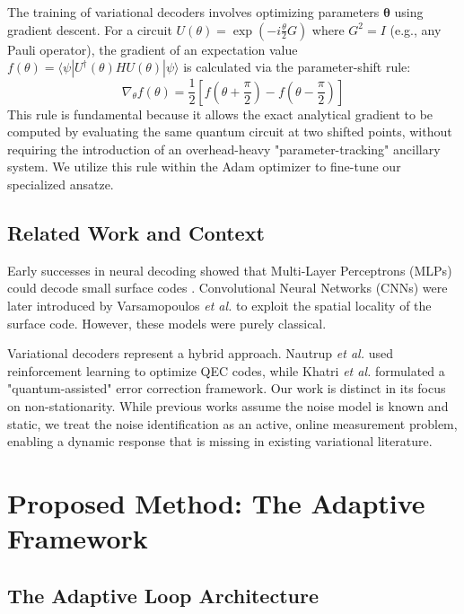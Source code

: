 \documentclass[journal,twocolumn]{IEEEtran}
\begin{document}
The training of variational decoders involves optimizing parameters $\boldsymbol{\theta}$ using gradient descent. For a circuit $U(\theta) = \exp(-i \frac{\theta}{2} G)$ where $G^2 = I$ (e.g., any Pauli operator), the gradient of an expectation value $f(\theta) = \langle \psi | U^\dagger(\theta) H U(\theta) | \psi \rangle$ is calculated via the parameter-shift rule:
\begin{equation}
    \nabla_\theta f(\theta) = \frac{1}{2} \left[ f\left(\theta + \frac{\pi}{2}\right) - f\left(\theta - \frac{\pi}{2}\right) \right]
\end{equation}
This rule is fundamental because it allows the exact analytical gradient to be computed by evaluating the same quantum circuit at two shifted points, without requiring the introduction of an overhead-heavy "parameter-tracking" ancillary system. We utilize this rule within the Adam optimizer to fine-tune our specialized ansatze.

\subsection{Related Work and Context}

Early successes in neural decoding showed that Multi-Layer Perceptrons (MLPs) could decode small surface codes \cite{chamberland2018deep}. Convolutional Neural Networks (CNNs) were later introduced by Varsamopoulos \textit{et al.} \cite{varsamopoulos2017decoding} to exploit the spatial locality of the surface code. However, these models were purely classical. 

Variational decoders represent a hybrid approach. Nautrup \textit{et al.} \cite{nautrup2019optimizing} used reinforcement learning to optimize QEC codes, while Khatri \textit{et al.} \cite{khatri2019quantum} formulated a "quantum-assisted" error correction framework. Our work is distinct in its focus on non-stationarity. While previous works assume the noise model is known and static, we treat the noise identification as an active, online measurement problem, enabling a dynamic response that is missing in existing variational literature.

\section{Proposed Method: The Adaptive Framework}

\subsection{The Adaptive Loop Architecture}
\end{document}
